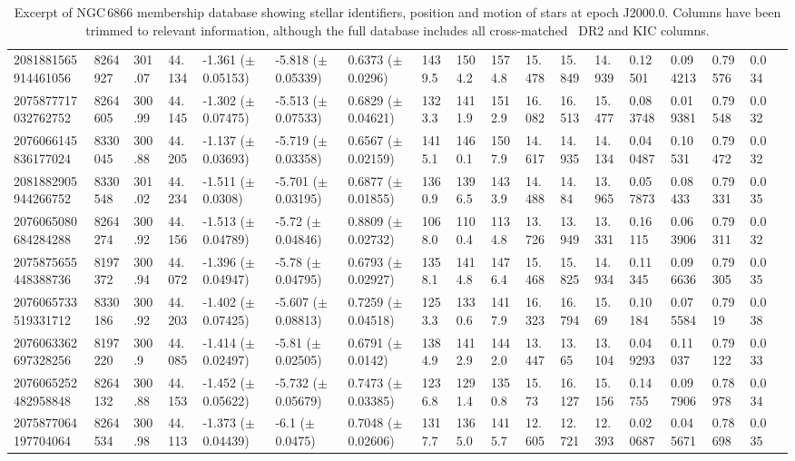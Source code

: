 \begin{sidewaystable}[htbp]
{\begin{tabular}{llllllllllllllllll}
        2081881565914461056 & 8264927 & 301.07 & 44.134 & -1.361 ($\pm$ 0.05153) & -5.818 ($\pm$ 0.05339) & 0.6373 ($\pm$ 0.0296) & 1439.5 & 1504.2 & 1574.8 & 15.478 & 15.849 & 14.939 & 0.12501 & 0.094213 & 0.79576 & 0.034 & \\
        2075877717032762752 & 8264605 & 300.99 & 44.145 & -1.302 ($\pm$ 0.07475) & -5.513 ($\pm$ 0.07533) & 0.6829 ($\pm$ 0.04621) & 1323.3 & 1411.9 & 1512.9 & 16.082 & 16.513 & 15.477 & 0.083748 & 0.019381 & 0.79548 & 0.032 & \\
        2076066145836177024 & 8330045 & 300.88 & 44.205 & -1.137 ($\pm$ 0.03693) & -5.719 ($\pm$ 0.03358) & 0.6567 ($\pm$ 0.02159) & 1415.1 & 1460.1 & 1507.9 & 14.617 & 14.935 & 14.134 & 0.040487 & 0.10531 & 0.79472 & 0.032 & \\
        2081882905944266752 & 8330548 & 301.02 & 44.234 & -1.511 ($\pm$ 0.0308) & -5.701 ($\pm$ 0.03195) & 0.6877 ($\pm$ 0.01855) & 1360.9 & 1396.5 & 1433.9 & 14.488 & 14.84 & 13.965 & 0.057873 & 0.08433 & 0.79331 & 0.035 & \\
        2076065080684284288 & 8264274 & 300.92 & 44.156 & -1.513 ($\pm$ 0.04789) & -5.72 ($\pm$ 0.04846) & 0.8809 ($\pm$ 0.02732) & 1068.0 & 1100.4 & 1134.8 & 13.726 & 13.949 & 13.331 & 0.16115 & 0.063906 & 0.79311 & 0.032 & \\
        2075875655448388736 & 8197372 & 300.94 & 44.072 & -1.396 ($\pm$ 0.04947) & -5.78 ($\pm$ 0.04795) & 0.6793 ($\pm$ 0.02927) & 1358.1 & 1414.8 & 1476.4 & 15.468 & 15.825 & 14.934 & 0.11345 & 0.096636 & 0.79305 & 0.035 & \\
        2076065733519331712 & 8330186 & 300.92 & 44.203 & -1.402 ($\pm$ 0.07425) & -5.607 ($\pm$ 0.08813) & 0.7259 ($\pm$ 0.04518) & 1253.3 & 1330.6 & 1417.9 & 16.323 & 16.794 & 15.69 & 0.10184 & 0.075584 & 0.7919 & 0.038 & \\
        2076063362697328256 & 8197220 & 300.9 & 44.085 & -1.414 ($\pm$ 0.02497) & -5.81 ($\pm$ 0.02505) & 0.6791 ($\pm$ 0.0142) & 1384.9 & 1412.9 & 1442.0 & 13.447 & 13.65 & 13.104 & 0.049293 & 0.11037 & 0.79122 & 0.033 & \\
        2076065252482958848 & 8264132 & 300.88 & 44.153 & -1.452 ($\pm$ 0.05622) & -5.732 ($\pm$ 0.05679) & 0.7473 ($\pm$ 0.03385) & 1236.8 & 1291.4 & 1350.8 & 15.73 & 16.127 & 15.156 & 0.14755 & 0.097906 & 0.78978 & 0.034 & \\
        2075877064197704064 & 8264534 & 300.98 & 44.113 & -1.373 ($\pm$ 0.04439) & -6.1 ($\pm$ 0.0475) & 0.7048 ($\pm$ 0.02606) & 1317.7 & 1365.0 & 1415.7 & 12.605 & 12.721 & 12.393 & 0.020687 & 0.045671 & 0.78698 & 0.035 & \\
        \bottomrule
    \end{tabular}
    }
    \caption[Excerpt of NGC\, 6866 membership database showing stellar identifiers, position and motion of stars at epoch J2000.0]{Excerpt of NGC\,6866 membership database showing stellar identifiers, position and motion of stars at epoch J2000.0. Columns have been trimmed to relevant information, although the full database includes all cross-matched \Gaia~DR2 and KIC columns.}
    \label{tab:6866mem}
\end{sidewaystable}